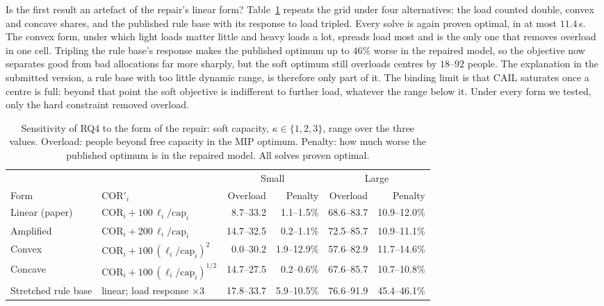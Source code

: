 \documentclass[systems,article,submit,moreauthors,pdftex]{Definitions/mdpi}
\begin{document}
Is the first result an artefact of the repair's linear form? Table~\ref{tab:forms} repeats the
grid under four alternatives: the load counted double, convex and concave shares, and the
published rule base with its response to load tripled. Every solve is again proven optimal, in
at most $11.4$\,s. The convex form, under which light loads matter little and heavy loads a lot,
spreads load most and is the only one that removes overload in one cell. Tripling the rule base's
response makes the published optimum up to $46\%$ worse in the repaired model, so the objective
now separates good from bad allocations far more sharply, but the soft optimum still overloads
centres by $18$--$92$ people. The explanation in the submitted version, a rule base with too little
dynamic range, is therefore only part of it. The binding limit is that CAIL saturates once a
centre is full: beyond that point the soft objective is indifferent to further load, whatever the
range below it. Under every form we tested, only the hard constraint removed overload.

\begin{table}[H]
\centering
\caption{Sensitivity of RQ4 to the form of the repair: soft capacity, $\kappa \in \{1, 2, 3\}$,
range over the three values. Overload: people beyond free capacity in the MIP optimum. Penalty:
how much worse the published optimum is in the repaired model. All solves proven
optimal.\label{tab:forms}}
\small
\begin{tabular}{llrrrr}
\toprule
& & \multicolumn{2}{c}{Small} & \multicolumn{2}{c}{Large}\\
\cmidrule(lr){3-4}\cmidrule(lr){5-6}
Form & $\mathrm{COR}'_i$ & Overload & Penalty & Overload & Penalty\\
\midrule
Linear (paper) & $\mathrm{COR}_i + 100\,\ell_i/\mathrm{cap}_i$ & 8.7--33.2 & 1.1--1.5\% & 68.6--83.7 & 10.9--12.0\%\\
Amplified & $\mathrm{COR}_i + 200\,\ell_i/\mathrm{cap}_i$ & 14.7--32.5 & 0.2--1.1\% & 72.5--85.7 & 10.9--11.1\%\\
Convex & $\mathrm{COR}_i + 100\,(\ell_i/\mathrm{cap}_i)^2$ & 0.0--30.2 & 1.9--12.9\% & 57.6--82.9 & 11.7--14.6\%\\
Concave & $\mathrm{COR}_i + 100\,(\ell_i/\mathrm{cap}_i)^{1/2}$ & 14.7--27.5 & 0.2--0.6\% & 67.6--85.7 & 10.7--10.8\%\\
Stretched rule base & linear; load response $\times 3$ & 17.8--33.7 & 5.9--10.5\% & 76.6--91.9 & 45.4--46.1\%\\
\bottomrule
\end{tabular}
\end{table}
\end{document}
